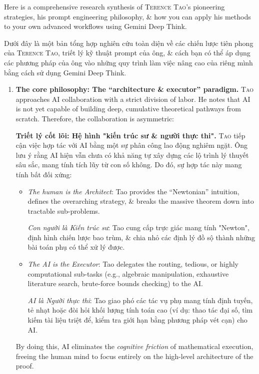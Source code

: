\documentclass{article}
\begin{document}
Here is a comprehensive research synthesis of \textsc{Terence Tao}'s pioneering strategies, his prompt engineering philosophy, \& how you can apply his methods to your own advanced workflows using Gemini Deep Think.

Dưới đây là một bản tổng hợp nghiên cứu toàn diện về các chiến lược tiên phong của \textsc{Terence Tao}, triết lý kỹ thuật prompt của ông, \& cách bạn có thể áp dụng các phương pháp của ông vào những quy trình làm việc nâng cao của riêng mình bằng cách sử dụng Gemini Deep Think.
\begin{enumerate}
	\item \textbf{The core philosophy: The ``architecture \& executor'' paradigm.} \textsc{Tao} approaches AI collaboration with a strict division of labor. He notes that AI is not yet capable of building deep, cumulative theoretical pathways from scratch. Therefore, the collaboration is asymmetric:
	
	\textbf{Triết lý cốt lõi: Hệ hình "kiến trúc sư \& người thực thi".} \textsc{Tao} tiếp cận việc hợp tác với AI bằng một sự phân công lao động nghiêm ngặt. Ông lưu ý rằng AI hiện vẫn chưa có khả năng tự xây dựng các lộ trình lý thuyết sâu sắc, mang tính tích lũy từ con số không. Do đó, sự hợp tác này mang tính bất đối xứng:
	\begin{itemize}
		\item \textit{The human is the Architect}: Tao provides the ``Newtonian'' intuition, defines the overarching strategy, \& breaks the massive theorem down into tractable sub-problems.
		
		\textit{Con người là Kiến trúc sư}: Tao cung cấp trực giác mang tính "Newton", định hình chiến lược bao trùm, \& chia nhỏ các định lý đồ sộ thành những bài toán phụ có thể xử lý được.
		\item \textit{The AI is the Executor}: \textsf{Tao} delegates the routing, tedious, or highly computational sub-tasks (e.g., algebraic manipulation, exhaustive literature search, brute-force bounds checking) to the AI.
		
		\textit{AI là Người thực thi}: \textsf{Tao} giao phó các tác vụ phụ mang tính định tuyến, tẻ nhạt hoặc đòi hỏi khối lượng tính toán cao (ví dụ: thao tác đại số, tìm kiếm tài liệu triệt để, kiểm tra giới hạn bằng phương pháp vét cạn) cho AI.
	\end{itemize}
	By doing this, AI eliminates the \textit{cognitive friction} of mathematical execution, freeing the human mind to focus entirely on the high-level architecture of the proof.
	

\end{enumerate}
\end{document}
